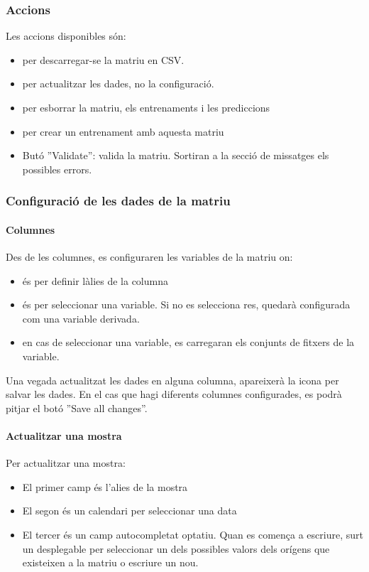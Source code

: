 \subsubsection{Accions} 
Les accions disponibles s\'{o}n:
\begin{itemize} 
\item \icondownload per descarregar-se la matriu en CSV.
\item \iconupdate per actualitzar les dades, no la configuració.
\item \icontrash per esborrar la matriu, els entrenaments i les prediccions
\item \icontraining per crear un entrenament amb aquesta matriu
\item But\'{o} ''Validate'': valida la matriu. Sortiran a la secció de missatges els possibles errors.
\end{itemize}

\phantonsection
\label{matrixConfiguration}
\subsubsection{Configuració de les dades de la matriu}
\paragraph*{Columnes} Des de les columnes, es configuraren les variables de la matriu on:
\begin{itemize}
\item \iconalia \'{e}s per definir l\`{a}lies de la columna
\item \iconvariable \'{e}s per seleccionar una variable. Si no es selecciona res, quedar\`{a} configurada com una variable derivada.
\item \iconseason en cas de seleccionar una variable, es carregaran els conjunts de fitxers de la variable.
\end{itemize}
Una vegada actualitzat les dades en alguna columna, apareixerà la icona \iconedit per salvar les dades. En el cas que hagi diferents columnes configurades, es podrà pitjar el bot\'{o} ''Save all changes''.

\paragraph*{Actualitzar una mostra} Per actualitzar una mostra:
\begin{itemize}
\item El primer camp \'{e}s l'alies de la mostra
\item El segon \'{e}s un calendari per seleccionar una data
\item El tercer \'{e}s un camp autocompletat optatiu. Quan es comença a escriure, surt un desplegable per seleccionar un dels possibles valors dels orígens que existeixen a la matriu o escriure un nou.
\end{itemize}

